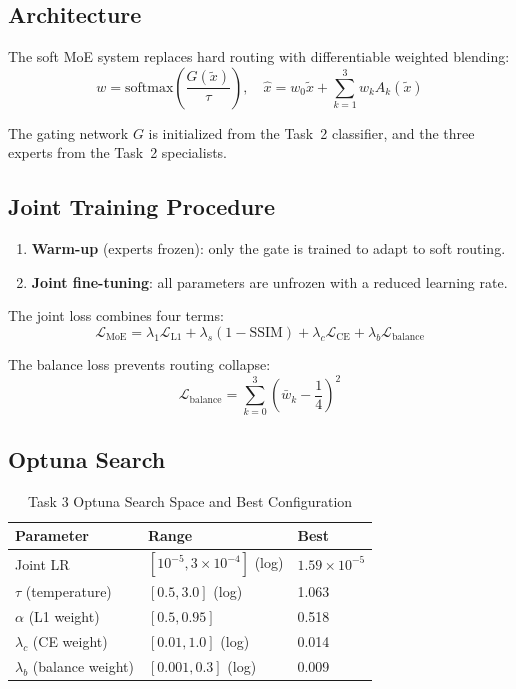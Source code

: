 \documentclass[conference]{IEEEtran}
\begin{document}
\subsection{Architecture}

The soft MoE system replaces hard routing with differentiable weighted blending:
\begin{equation}
    w = \text{softmax}\left(\frac{G(\tilde{x})}{\tau}\right), \quad
    \hat{x} = w_0 \tilde{x} + \sum_{k=1}^{3} w_k A_k(\tilde{x})
\end{equation}

The gating network $G$ is initialized from the Task~2 classifier, and the three experts from the Task~2 specialists.

\subsection{Joint Training Procedure}

\begin{enumerate}
    \item \textbf{Warm-up} (experts frozen): only the gate is trained to adapt to soft routing.
    \item \textbf{Joint fine-tuning}: all parameters are unfrozen with a reduced learning rate.
\end{enumerate}

The joint loss combines four terms:
\begin{equation}
    \mathcal{L}_{\text{MoE}} = \lambda_1 \mathcal{L}_{\text{L1}} + \lambda_s (1 - \text{SSIM}) + \lambda_c \mathcal{L}_{\text{CE}} + \lambda_b \mathcal{L}_{\text{balance}}
\end{equation}

The balance loss prevents routing collapse:
\begin{equation}
    \mathcal{L}_{\text{balance}} = \sum_{k=0}^{3}\left(\bar{w}_k - \frac{1}{4}\right)^2
\end{equation}

\subsection{Optuna Search}

\begin{table}[h]
\centering
\caption{Task 3 Optuna Search Space and Best Configuration}
\label{tab:t3optuna}
\begin{tabular}{lll}
\toprule
Parameter & Range & Best \\
\midrule
Joint LR & $[10^{-5}, 3 \times 10^{-4}]$ (log) & $1.59 \times 10^{-5}$ \\
$\tau$ (temperature) & $[0.5, 3.0]$ (log) & 1.063 \\
$\alpha$ (L1 weight) & $[0.5, 0.95]$ & 0.518 \\
$\lambda_c$ (CE weight) & $[0.01, 1.0]$ (log) & 0.014 \\
$\lambda_b$ (balance weight) & $[0.001, 0.3]$ (log) & 0.009 \\
\bottomrule
\end{tabular}
\end{table}
\end{document}
